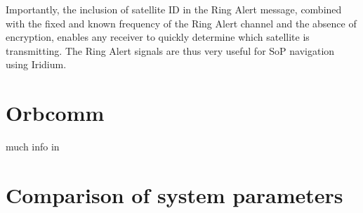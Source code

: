 Importantly, the inclusion of satellite ID in the Ring Alert message, combined with the fixed and known frequency of the Ring Alert channel and the absence of encryption, enables any receiver to quickly determine which satellite is transmitting. The Ring Alert signals are thus very useful for SoP navigation using Iridium.

\section{Orbcomm}
much info in \cite{sop08}

\section{Comparison of system parameters}